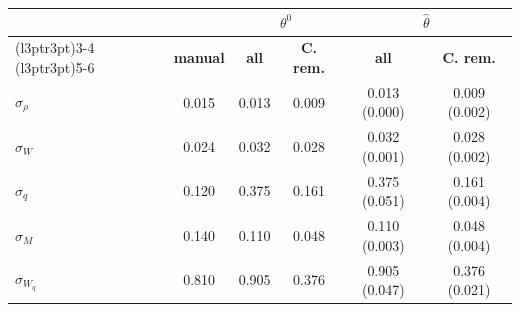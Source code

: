 
\begin{tabular}{lccccc}
\toprule
\multicolumn{2}{c}{ } & \multicolumn{2}{c}{$\theta^0$} & \multicolumn{2}{c}{$\hat\theta$} \\
\cmidrule(l{3pt}r{3pt}){3-4} \cmidrule(l{3pt}r{3pt}){5-6}
  & \textbf{manual} & \textbf{all} & \textbf{C. rem.} & \textbf{all} & \textbf{C. rem.}\\
\midrule
$\hat\sigma_{ \rho }$ & 0.015 & 0.013 & 0.009 & 0.013 (0.000) & 0.009 (0.002)\\
$\hat\sigma_{ W }$ & 0.024 & 0.032 & 0.028 & 0.032 (0.001) & 0.028 (0.002)\\
$\hat\sigma_{ q }$ & 0.120 & 0.375 & 0.161 & 0.375 (0.051) & 0.161 (0.004)\\
$\hat\sigma_{ M }$ & 0.140 & 0.110 & 0.048 & 0.110 (0.003) & 0.048 (0.004)\\
$\hat\sigma_{ W_q }$ & 0.810 & 0.905 & 0.376 & 0.905 (0.047) & 0.376 (0.021)\\
\bottomrule
\end{tabular}